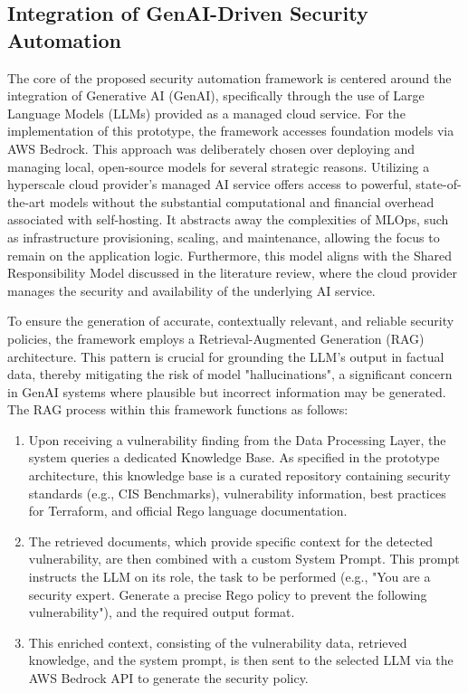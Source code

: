 
\subsection{Integration of GenAI-Driven Security Automation} %
\label{sub:Integration of GenAI-Driven Security Automation}


The core of the proposed security automation framework is centered around the integration of Generative AI (GenAI), specifically through the use of Large Language Models (LLMs) provided as a managed cloud service. For the implementation of this prototype, the framework accesses foundation models via AWS Bedrock. This approach was deliberately chosen over deploying and managing local, open-source models for several strategic reasons. Utilizing a hyperscale cloud provider's managed AI service offers access to powerful, state-of-the-art models without the substantial computational and financial overhead associated with self-hosting. It abstracts away the complexities of MLOps, such as infrastructure provisioning, scaling, and maintenance, allowing the focus to remain on the application logic. Furthermore, this model aligns with the Shared Responsibility Model discussed in the literature review, where the cloud provider manages the security and availability of the underlying AI service.

To ensure the generation of accurate, contextually relevant, and reliable security policies, the framework employs a Retrieval-Augmented Generation (RAG) architecture. This pattern is crucial for grounding the LLM's output in factual data, thereby mitigating the risk of model "hallucinations", a significant concern in GenAI systems where plausible but incorrect information may be generated. The RAG process within this framework functions as follows:
\begin{enumerate}
    \item Upon receiving a vulnerability finding from the Data Processing Layer, the system queries a dedicated Knowledge Base. As specified in the prototype architecture, this knowledge base is a curated repository containing security standards (e.g., CIS Benchmarks), vulnerability information, best practices for Terraform, and official Rego language documentation.
    \item The retrieved documents, which provide specific context for the detected vulnerability, are then combined with a custom System Prompt. This prompt instructs the LLM on its role, the task to be performed (e.g., "You are a security expert. Generate a precise Rego policy to prevent the following vulnerability"), and the required output format.
    \item This enriched context, consisting of the vulnerability data, retrieved knowledge, and the system prompt, is then sent to the selected LLM via the AWS Bedrock API to generate the security policy.
\end{enumerate}

